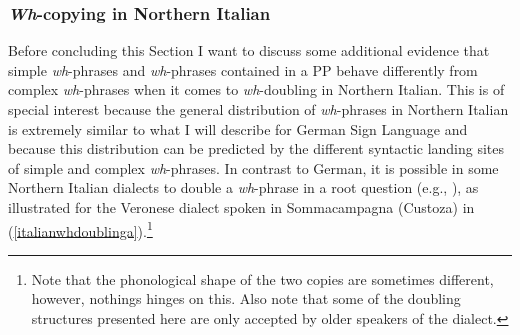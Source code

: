 %
%
%
%
%

\largerpage[-1]
\subsubsection{\textit{Wh}-copying in Northern Italian}
Before concluding this Section I want to discuss some additional evidence that simple \textit{wh}-phrases and \textit{wh}-phrases contained in a PP behave differently from complex \textit{wh}-phrases when it comes to \textit{wh}-doubling in Northern Italian. This is of special interest because the general distribution of \textit{wh}-phrases in Northern Italian is extremely similar to what I will describe for German Sign Language and because this distribution can be predicted by the different syntactic landing sites of simple and complex \textit{wh}-phrases. In contrast to German, it is possible in some Northern Italian dialects to double a \textit{wh}-phrase in a root question (e.g., \citealt{poletto2005wh, munaro2005quest}), as illustrated for the Veronese dialect spoken in Sommacampagna (Custoza) in (\ref{italianwhdoublinga}).\footnote{Note that the phonological shape of the two copies are sometimes different, however, nothings hinges on this. Also note that some of the doubling structures presented here are only accepted by older speakers of the dialect.}

